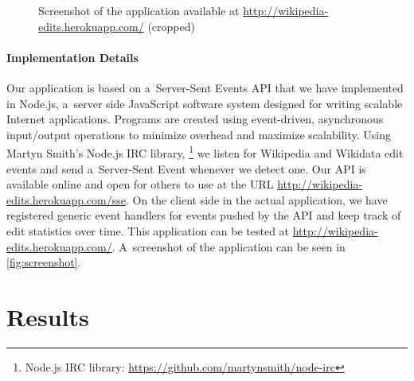 \documentclass{sig-alternate}
\newcommand{\inlinelistingsize}{\fontsize{8pt}{11pt}}
\let\oldurl\url
\renewcommand{\url}[1]{\inlinelistingsize\oldurl{#1}}
\begin{document}
\begin{figure}[h!]
  \centering
  \caption{Screenshot of the application available at \url{http://wikipedia-edits.herokuapp.com/} (cropped)}
  \label{fig:screenshot}
\end{figure}

\paragraph{Implementation Details}

Our application is based on a~Server-Sent Events API
that we have implemented in Node.js,
a~server side JavaScript software system
designed for writing scalable Internet applications.
Programs are created using event-driven,
asynchronous input/output operations
to minimize overhead and maximize scalability.
Using Martyn Smith's Node.js IRC library,%
\footnote{Node.js IRC library:
\url{https://github.com/martynsmith/node-irc}}
we listen for Wikipedia and Wikidata edit events
and send a~Server-Sent Event whenever we detect one.
Our API is available online and open for others to use at the URL
\url{http://wikipedia-edits.herokuapp.com/sse}.
On the client side in the actual application,
we have registered generic event handlers for events
pushed by the API and keep track of edit statistics over time.
This application can be tested at
\url{http://wikipedia-edits.herokuapp.com/}.\linebreak
A~screenshot of the application
can be seen in \autoref{fig:screenshot}.

\section{Results}
\end{document}
